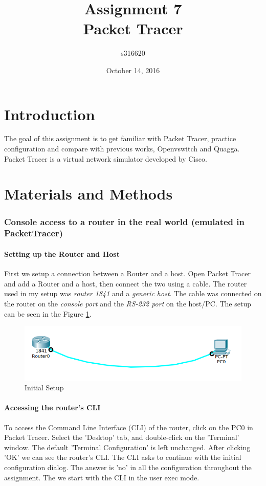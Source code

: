 \documentclass{article}
\date{October 14, 2016}
\title{\textbf{Assignment 7}\\Packet Tracer}
\author{s316620}
\begin{document}
\maketitle

\newpage

\tableofcontents

\newpage
\part{Introduction}

The goal of this assignment is to get familiar with Packet Tracer, practice configuration and compare with previous works, Openvswitch and Quagga. Packet Tracer is a virtual network simulator developed by Cisco.

\part{Materials and Methods}


\section{Console access to a router in the real world (emulated in PacketTracer)}

\subsection{Setting up the Router and Host}
First we setup a connection between a Router and a host. Open Packet Tracer and add a Router and a host, then connect the two using a cable. The router used in my setup was \textit{router 1841} and a \textit{generic host}. The cable was connected on the router on the \textit{console port} and the \textit{RS-232 port} on the host/PC. The setup can be seen in the Figure \ref{fig:firstset}.
\begin{figure}[h]
    \centering
    \includegraphics[width=\textwidth]{firstsetup}
    \caption{Initial Setup}
    \label{fig:firstset}
\end{figure}

\subsection{Accessing the router's CLI}
To access the Command Line Interface (CLI) of the router, click on the PC0 in Packet Tracer. Select the 'Desktop' tab, and double-click on the 'Terminal' window. The default 'Terminal Configuration' is left unchanged. After clicking 'OK' we can see the router's CLI. The CLI asks to continue with the initial configuration dialog. The answer is 'no' in all the configuration throughout the assignment. The we start with the CLI in the user exec mode. 
\end{document}
